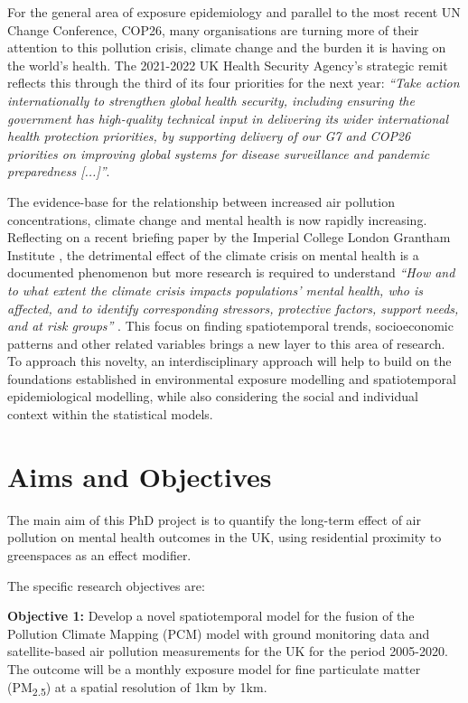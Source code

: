 For the general area of exposure epidemiology and parallel to the most recent UN Change Conference, COP26, many organisations are turning more of their attention to this pollution crisis, climate change and the burden it is having on the world's health. The 2021-2022 UK Health Security Agency's strategic remit \citep{Bethell2021UKPriorities} reflects this through the third of its four priorities for the next year: \emph{``Take action internationally to strengthen global health security, including ensuring the government has high-quality technical input in delivering its wider international health protection priorities, by supporting delivery of our G7 and COP26 priorities on improving global systems for disease surveillance and pandemic preparedness [...]''}.

The evidence-base for the relationship between increased air pollution concentrations, climate change and mental health is now rapidly increasing. Reflecting on a recent briefing paper by the Imperial College London Grantham Institute \citep{Lawrance2021ThePractice}, the detrimental effect of the climate crisis on mental health is a documented phenomenon but more research is required to understand \emph{``How and to what extent the climate crisis impacts populations’ mental health, who is affected, and to identify corresponding stressors, protective factors, support needs, and at risk groups''} \citep{Lawrance2021ThePractice}. This focus on finding spatiotemporal trends, socioeconomic patterns and other related variables brings a new layer to this area of research. To approach this novelty, an interdisciplinary approach will help to build on the foundations established in environmental exposure modelling and spatiotemporal epidemiological modelling, while also considering the social and individual context within the statistical models.

\section{Aims and Objectives}

The main aim of this PhD project is to quantify the long-term effect of air pollution on mental health outcomes in the UK, using residential proximity to greenspaces as an effect modifier.

The specific research objectives are:

\textbf{Objective 1:} Develop a novel spatiotemporal model for the fusion of the Pollution Climate Mapping (PCM) model with ground monitoring data and satellite-based air pollution measurements for the UK for the period 2005-2020. The outcome will be a monthly exposure model for fine particulate matter (PM\textsubscript{2.5}) at a spatial resolution of 1km by 1km. 

